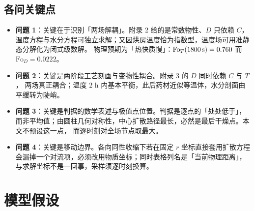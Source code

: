 \documentclass[bwprint]{cumcmthesis}
\begin{document}
\subsection{各问关键点}

\begin{itemize}[leftmargin=1.7em,itemsep=2pt]
\item \textbf{问题 1}：关键在于识别「两场解耦」。附录 2 给的是常数物性、$D$ 只依赖 $C$，
温度方程与水分方程可独立求解；又因烘房温度恰为指数型，温度场可用准静态分解化为闭式级数解。
物理预期为「热快质慢」：$\mathrm{Fo}_T(1800\,{\rm s})=0.760$ 而 $\mathrm{Fo}_D=0.0222$。
\item \textbf{问题 2}：关键是两阶段工艺刻画与变物性耦合。附录 3 的 $D$ 同时依赖 $C$ 与 $T$，
两场真正耦合；温度 $2$ h 内基本平衡，此后药材近似等温体，水分剖面由平缓转为陡峭。
\item \textbf{问题 3}：关键是判据的数学表述与极值点位置。判据是逐点的「处处低于」，
而非平均值；由圆柱几何对称性，中心扩散路径最长，必然是最后干燥点。本文不预设这一点，
而逐时刻对全场节点取最大。
\item \textbf{问题 4}：关键是移动边界。各向同性收缩下若在固定 $r$ 坐标直接套用扩散方程
会漏掉一个对流项，必须改用物质坐标；同时表格列名是「当前物理距离」，
与求解坐标不是一回事，采样须逐时刻换算。
\end{itemize}

\section{模型假设}
\end{document}

